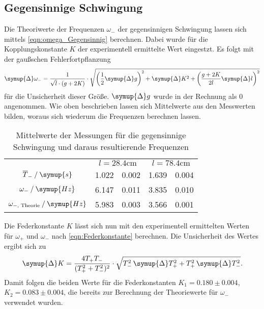 \subsection{Gegensinnige Schwingung}
\label{subsec:Gegensinnig}
Die Theoriwerte der Frequenzen $\omega_-$ der gegensinnigen Schwingung lassen sich mittels \autoref{eqn:omega_Gegensinnig} berechnen. Dabei wurde für die Kopplungskonstante $K$ 
der experimentell ermittelte Wert eingestzt. Es folgt mit der gaußschen Fehlerfortpflanzung
\begin{equation*}
    \label{eqn:DeltaOmegaMinus}
    \symup{\Delta}\omega_- = \frac{1}{\sqrt{l} \cdot (g + 2K)} \cdot \sqrt{\left(\frac{1}{2}\symup{\Delta}g\right)^2 + \symup{\Delta}K^2 + \left(\frac{g+2K}{2l}\symup{\Delta}l\right)^2}
\end{equation*}
für die Unsicherheit dieser Größe. $\symup{\Delta}g$ wurde in der Rechnung als $0$ angenommen. Wie oben beschrieben lassen sich Mittelwerte aus den Messwerten bilden,
woraus sich wiederum die Frequenzen berechnen lassen. 

\begin{table}
    \centering
    \caption{Mittelwerte der Messungen für die gegensinnige Schwingung und daraus resultierende Frequenzen}
    \begin{tabular}{c S @{${}\pm{}$} S S @{${}\pm{}$} S}
    \toprule
    &  &  \\
    \cmidrule(lr){2-3}\cmidrule(lr){4-5}
    {$\overline{T}_- \mathbin{/} \symup{s}$}                & 1.022 & 0.002 & 1.639 & 0.004 \\
    {$\omega_- \mathbin{/} \symup{Hz}$}                     & 6.147 & 0.011 & 3.835 & 0.010 \\
    {$\omega_{{-}\text{, Theorie}} \mathbin{/} \symup{Hz}$} & 5.983 & 0.003 & 3.566 & 0.001 \\
    \bottomrule
    \end{tabular}
\end{table}
Die Federkonstante $K$ lässt sich nun mit den experimentell ermittelten Werten für $\omega_+$ und $\omega_-$ nach \autoref{eqn:Federkonstante} berechnen.
Die Unsicherheit des Wertes ergibt sich zu
\begin{equation*}
    \label{eqn:DeltaK}
    \symup{\Delta}K = \frac{4T_+T_-}{(T_+^2 + T_-^2)^2} \cdot \sqrt{T_-^2 \, \symup{\Delta}T_+^2 + T_+^2 \, \symup{\Delta}T_-^2}.
\end{equation*}
Damit folgen die beiden Werte für die Federkonstanten $K_1 = 0.180 \pm 0.004$, $K_2 = 0.083 \pm 0.004$, die bereits zur Berechnung der Theoriewerte für $\omega_-$ verwendet wurden.

